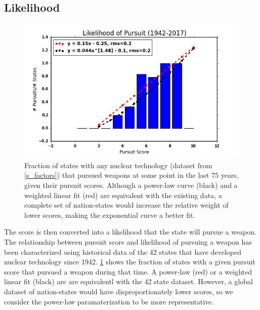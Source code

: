  \subsection{Likelihood}

\begin{figure}%
\begin{center}
\includegraphics[scale=0.8]{./figs/pe_likely.png}
\end{center}
\caption{Fraction of states with any nuclear technology (dataset from \ref{s_factors}) that pursued weapons at some point in the last 75 years, given their pursuit scores. Although a power-law curve (black) and a weighted linear fit (red) are equivalent with the existing data, a complete set of nation-states would increase the relative weight of lower scores, making the exponential curve a better fit.}
\label{fig:likely}
\end{figure}
 
The score is then converted into a likelihood that the state will pursue a weapon. The relationship between pursuit score and likelihood of pursuing a weapon has been characterized using historical data of the 42 states that have developed nuclear technology since 1942.  \ref{fig:likely} shows the fraction of states with a given pursuit score that pursued a weapon during that time. A power-law (red) or a weighted linear fit (black) are are equivalentl with the 42 state dataset. However, a global dataset of nation-states would have disproportionately lower scores, so we consider the power-law paramaterization to be more representative.


